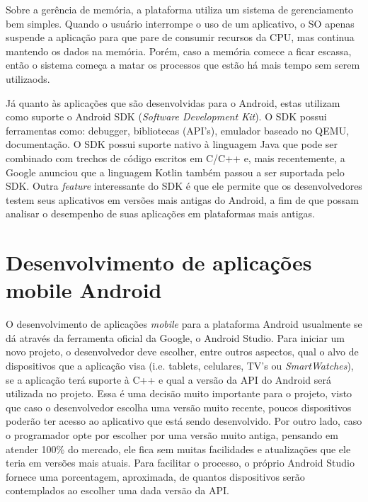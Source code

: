 \documentclass[
    12pt,       %
    openright,      %
    twoside,      %
    a4paper,      %
    english,      %
    french,       %
    spanish,      %
    brazil,       %
    ]{abntex2}
\begin{document}
        Sobre a gerência de memória, a plataforma utiliza um sistema de gerenciamento bem simples.
        Quando o usuário interrompe o uso de um aplicativo, o SO apenas suspende a aplicação para
        que pare de consumir recursos da CPU, mas continua mantendo os dados na memória. Porém, caso
        a memória comece a ficar escassa, então o sistema começa a matar os processos que estão
        há mais tempo sem serem utilizaods.

        Já quanto às aplicações que são desenvolvidas para o Android, estas utilizam como suporte
        o Android SDK (\textit{Software Development Kit}). O SDK possui ferramentas como: debugger,
        bibliotecas (API's), emulador baseado no QEMU, documentação. O SDK possui suporte nativo
        à linguagem Java que pode ser combinado com trechos de código escritos em C/C++ e,
        mais recentemente, a Google anunciou que a linguagem Kotlin também passou a ser suportada
        pelo SDK. Outra \textit{feature} interessante do SDK é que ele permite que os
        desenvolvedores testem seus aplicativos em versões mais antigas do Android, a fim de
        que possam analisar o desempenho de suas aplicações em plataformas mais antigas.

      \section{Desenvolvimento de aplicações mobile Android}
        O desenvolvimento de aplicações \textit{mobile} para a plataforma Android usualmente se dá através
        da ferramenta oficial da Google, o Android Studio. Para iniciar um novo projeto, o
        desenvolvedor deve escolher, entre outros aspectos, qual o alvo de dispositivos que a
        aplicação visa (i.e. tablets, celulares, TV's ou \textit{SmartWatches}), se a aplicação
        terá suporte à C++ e qual a versão da API do Android será utilizada no projeto. Essa é
        uma decisão muito importante para o projeto, visto que caso o desenvolvedor escolha
        uma versão muito recente, poucos dispositivos poderão ter acesso ao aplicativo que está
        sendo desenvolvido. Por outro lado, caso o programador opte por escolher por uma versão
        muito antiga, pensando em atender 100\% do mercado, ele fica sem muitas facilidades e
        atualizações que ele teria em versões mais atuais. Para facilitar o processo, o próprio
        Android Studio fornece uma porcentagem, aproximada, de quantos dispositivos serão contemplados
        ao escolher uma dada versão da API.
\end{document}
